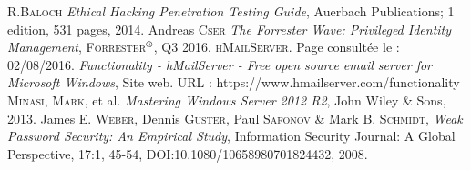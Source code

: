 \begin{thebibliography}{ABC}	
     R.\textsc{Baloch} \emph{Ethical Hacking Penetration Testing Guide}, Auerbach Publications; 1 edition, 531 pages, 2014.
     Andreas \textsc{Cser} \emph{The Forrester Wave\texttrademark: Privileged Identity Management}, \textsc{Forrester$^{\mbox{\scriptsize{\textregistered}}}$}, Q3 2016.
     \textsc{hMailServer}. Page consultée le : 02/08/2016. \emph{Functionality - hMailServer - Free open source email server for Microsoft Windows}, Site web. \textsc{URL} : https://www.hmailserver.com/functionality
     \textsc{Minasi}, \textsc{Mark}, et al. \emph{Mastering Windows Server 2012 R2}, John Wiley \& Sons, 2013.
     James E. \textsc{Weber}, Dennis \textsc{Guster}, Paul \textsc{Safonov} \& Mark B. \textsc{Schmidt}, \emph{Weak Password Security: An Empirical Study}, Information Security Journal: A Global Perspective, 17:1, 45-54, DOI:10.1080/10658980701824432, 2008.
\end{thebibliography}
